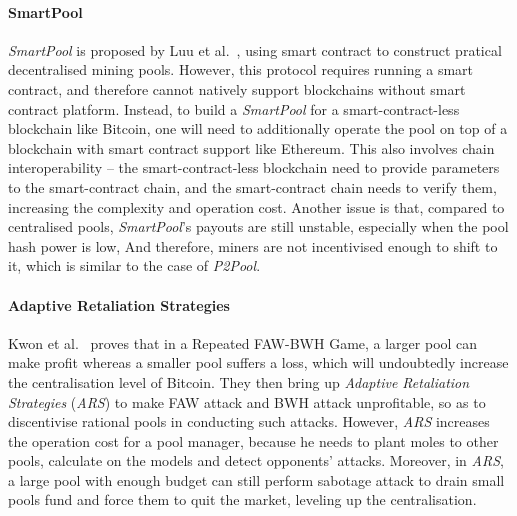 \paragraph{\textbf{SmartPool}}
\textit{SmartPool} is proposed by Luu et al.~\cite{luu2017smartpool}, using smart contract to construct pratical decentralised mining pools.
However, this protocol requires running a smart contract, and therefore cannot natively support blockchains without smart contract platform.
Instead, to build a \textit{SmartPool} for a smart-contract-less blockchain like Bitcoin, one will need to additionally operate the pool on top of a blockchain with smart contract support like Ethereum.
This also involves chain interoperability -- the smart-contract-less blockchain need to provide parameters to the smart-contract chain, and the smart-contract chain needs to verify them, increasing the complexity and operation cost.
Another issue is that, compared to centralised pools, \textit{SmartPool}'s payouts are still unstable, especially when the pool hash power is low,
And therefore, miners are not incentivised enough to shift to it, which is similar to the case of \textit{P2Pool}.


\paragraph{\textbf{Adaptive Retaliation Strategies}}
Kwon et al.~\cite{kwon2019eye} proves that in a Repeated FAW\cite{courtois2014subversive,rosenfeld2011analysis}-BWH\cite{kwon2017selfish} Game, a larger pool can make profit whereas a smaller pool suffers a loss, which will undoubtedly increase the centralisation level of Bitcoin.
They then bring up \textit{Adaptive Retaliation Strategies} (\textit{ARS}) to make FAW attack and BWH attack unprofitable, so as to discentivise rational pools in conducting such attacks.
However, \textit{ARS} increases the operation cost for a pool manager, because he needs to plant moles to other pools, calculate on the models and detect opponents' attacks.
Moreover, in \textit{ARS}, a large pool with enough budget can still perform sabotage attack to drain small pools fund and force them to quit the market, leveling up the centralisation.


